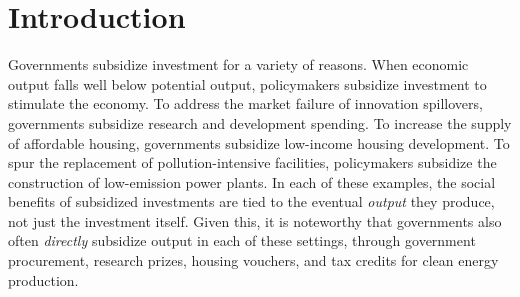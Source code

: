 \documentclass[12pt]{article}
\begin{document}
\date{\monthyeardate\today}
\maketitle
\begin{abstract}
\noindent This paper examines the choice between subsidizing investment and subsidizing output to promote socially desirable production. We exploit a natural experiment to estimate the impact of subsidy margin on the productivity of wind farms. Using instrumental variable and matching estimators, we find that investment subsidy claimants produce  \unskip to percent less power than they would have under the output subsidy. Accounting for extensive margin effects, we show that output subsidies are more cost-effective than investment subsidies over a large range of output targets. 

\vspace{1cm}

\noindent Keywords: tax credits, energy subsidies, instrument choice

\noindent JEL Codes: H23, Q42, Q48

\vspace{1cm}
\end{abstract}

\pagebreak
\section{Introduction}

Governments subsidize investment for a variety of reasons. When economic output falls well below potential output, policymakers subsidize investment to stimulate the economy. To address the market failure of innovation spillovers, governments subsidize research and development spending. To increase the supply of affordable housing, governments subsidize low-income housing development. To spur the replacement of pollution-intensive facilities, policymakers subsidize the construction of low-emission power plants. In each of these examples, the social benefits of subsidized investments are tied to the eventual \textit{output} they produce, not just the investment itself. Given this, it is noteworthy that governments also often \textit{directly} subsidize output in each of these settings, through government procurement, research prizes, housing vouchers, and tax credits for clean energy production. 
\end{document}
